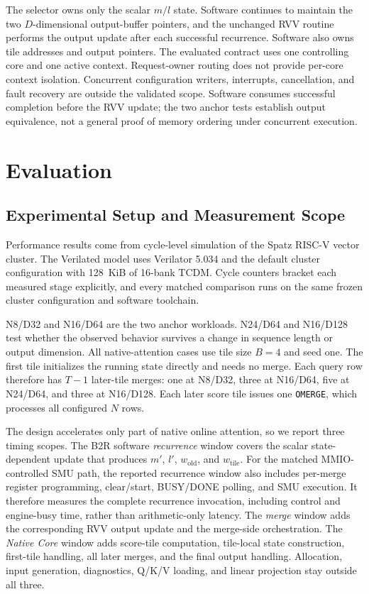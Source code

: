 \documentclass[journal]{IEEEtran}
\begin{document}
The selector owns only the scalar $m/l$ state. Software continues to maintain
the two $D$-dimensional output-buffer pointers, and the unchanged RVV routine
performs the output update after each successful recurrence. Software also owns
tile addresses and output pointers.
The evaluated contract uses one controlling core and one active context.
Request-owner routing does not provide per-core context isolation. Concurrent
configuration writers, interrupts, cancellation, and fault recovery are outside
the validated scope. Software consumes successful completion before the RVV
update; the two anchor tests establish output equivalence, not a general proof
of memory ordering under concurrent execution.

\section{Evaluation}

\subsection{Experimental Setup and Measurement Scope}
Performance results come from cycle-level simulation of the Spatz RISC-V vector
cluster. The Verilated model uses Verilator 5.034 and the default cluster
configuration with 128~KiB of 16-bank TCDM. Cycle counters bracket each
measured stage explicitly, and every matched comparison runs on the same frozen
cluster configuration and software toolchain.

N8/D32 and N16/D64 are the two anchor workloads. N24/D64 and N16/D128 test
whether the observed behavior survives a change in sequence length or output
dimension. All native-attention cases use tile size $B=4$ and seed one. The
first tile initializes the running state directly and needs no merge. Each
query row therefore has $T-1$ later-tile merges: one at N8/D32, three at
N16/D64, five at N24/D64, and three at N16/D128. Each later score tile issues
one \texttt{OMERGE}, which processes all configured $N$ rows.

The design accelerates only part of native online attention, so we report three
timing scopes. The B2R software \emph{recurrence} window covers the scalar
state-dependent update that produces $m'$, $l'$, $w_{\mathrm{old}}$, and
$w_{\mathrm{tile}}$. For the matched MMIO-controlled SMU path, the reported
recurrence window also includes per-merge register programming, clear/start,
BUSY/DONE polling, and SMU execution. It therefore measures the complete
recurrence invocation, including control and engine-busy time, rather than
arithmetic-only latency. The \emph{merge} window adds the corresponding RVV
output update and the merge-side orchestration. The \emph{Native Core} window
adds score-tile computation, tile-local state construction, first-tile handling,
all later merges, and the final output handling. Allocation, input generation,
diagnostics, Q/K/V loading, and linear projection stay outside all three.
\end{document}
